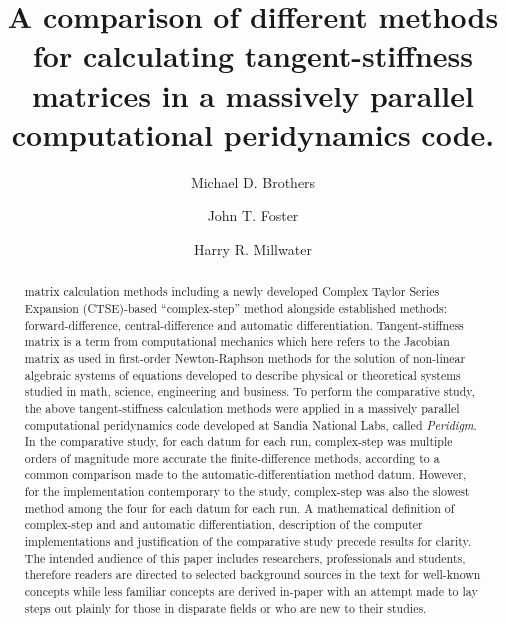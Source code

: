 \documentclass[preprint,12pt]{elsarticle}
\begin{document}
\begin{frontmatter}


\author{Michael D. Brothers}
\author{John T. Foster}
\author{Harry R. Millwater}
\address{Mechanical Engineering Department, The University of Texas at San Antonio}


\title{A comparison of different methods for calculating tangent-stiffness matrices in a massively parallel computational peridynamics code.}


\begin{abstract} %
matrix calculation methods including a newly developed Complex Taylor Series Expansion
(CTSE)-based ``complex-step'' method alongside established methods: forward-difference,
central-difference and automatic differentiation.  Tangent-stiffness matrix is a term from
computational mechanics which here refers to the Jacobian matrix as used in first-order
Newton-Raphson methods for the solution of non-linear algebraic systems of equations developed
to describe physical or theoretical systems studied in math, science, engineering and business.
To perform the comparative study, the above tangent-stiffness calculation methods were applied
in a massively parallel computational peridynamics code developed at Sandia National Labs,
called \emph{Peridigm}. In the comparative study, for each datum for each run, complex-step was
multiple orders of magnitude more accurate the finite-difference methods, according to a common
comparison made to the automatic-differentiation method datum. However, for the implementation
contemporary to the study, complex-step was also the slowest method among the four for each
datum for each run. A mathematical definition of complex-step and
and automatic differentiation, description of the computer implementations and justification
of the comparative study precede results for clarity. The intended audience of this paper
includes researchers, professionals and students, therefore readers are directed to
selected background sources in the text for well-known concepts while less familiar concepts
are derived in-paper with an attempt made to lay steps out plainly for those in disparate fields
or who are new to their studies.  \end{abstract}


\end{frontmatter}
\end{document}
